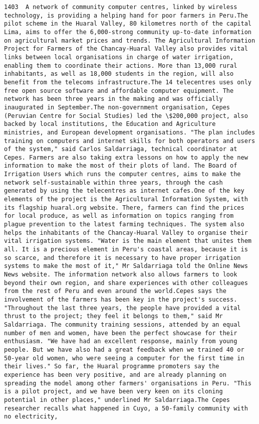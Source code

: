 \documentclass[11pt]{article}
\begin{document}
\begin{Verbatim}[commandchars=\\\{\}]
         1403  A network of community computer centres, linked by wireless technology, is providing a helping hand for poor farmers in Peru.The pilot scheme in the Huaral Valley, 80 kilometres north of the capital Lima, aims to offer the 6,000-strong community up-to-date information on agricultural market prices and trends. The Agricultural Information Project for Farmers of the Chancay-Huaral Valley also provides vital links between local organisations in charge of water irrigation, enabling them to coordinate their actions. More than 13,000 rural inhabitants, as well as 18,000 students in the region, will also benefit from the telecoms infrastructure.The 14 telecentres uses only free open source software and affordable computer equipment. The network has been three years in the making and was officially inaugurated in September.The non-government organisation, Cepes (Peruvian Centre for Social Studies) led the \$200,000 project, also backed by local institutions, the Education and Agriculture ministries, and European development organisations. "The plan includes training on computers and internet skills for both operators and users of the system," said Carlos Saldarriaga, technical coordinator at Cepes. Farmers are also taking extra lessons on how to apply the new information to make the most of their plots of land. The Board of Irrigation Users which runs the computer centres, aims to make the network self-sustainable within three years, through the cash generated by using the telecentres as internet cafes.One of the key elements of the project is the Agricultural Information System, with its flagship huaral.org website. There, farmers can find the prices for local produce, as well as information on topics ranging from plague prevention to the latest farming techniques. The system also helps the inhabitants of the Chancay-Huaral Valley to organise their vital irrigation systems. "Water is the main element that unites them all. It is a precious element in Peru's coastal areas, because it is so scarce, and therefore it is necessary to have proper irrigation systems to make the most of it," Mr Saldarriaga told the Online News News website. The information network also allows farmers to look beyond their own region, and share experiences with other colleagues from the rest of Peru and even around the world.Cepes says the involvement of the farmers has been key in the project's success. "Throughout the last three years, the people have provided a vital thrust to the project; they feel it belongs to them," said Mr Saldarriaga. The community training sessions, attended by an equal number of men and women, have been the perfect showcase for their enthusiasm. "We have had an excellent response, mainly from young people. But we have also had a great feedback when we trained 40 or 50-year old women, who were seeing a computer for the first time in their lives." So far, the Huaral programme promoters say the experience has been very positive, and are already planning on spreading the model among other farmers' organisations in Peru. "This is a pilot project, and we have been very keen on its cloning potential in other places," underlined Mr Saldarriaga.The Cepes researcher recalls what happened in Cuyo, a 50-family community with no electricity, 
\end{Verbatim}
\end{document}
